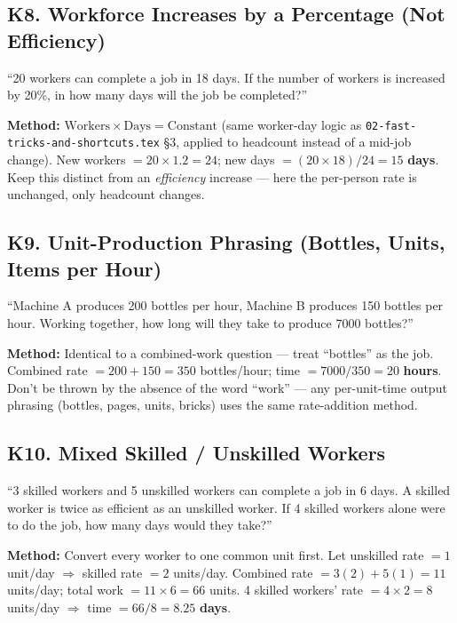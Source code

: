 \documentclass[11pt]{article}
\begin{document}
\subsection*{K8. Workforce Increases by a Percentage (Not Efficiency)}
\begin{tipbox}[Phrasing]
``20 workers can complete a job in 18 days. If the number of workers is increased by 20\%, in how
many days will the job be completed?''
\end{tipbox}
\textbf{Method:} $\text{Workers}\times\text{Days}=\text{Constant}$ (same worker-day logic as
\texttt{02-fast-tricks-and-shortcuts.tex} \S3, applied to headcount instead of a mid-job change). New
workers $=20\times1.2=24$; new days $=(20\times18)/24=15$ \textbf{days}. Keep this distinct from an
\emph{efficiency} increase --- here the per-person rate is unchanged, only headcount changes.

\subsection*{K9. Unit-Production Phrasing (Bottles, Units, Items per Hour)}
\begin{tipbox}[Phrasing]
``Machine A produces 200 bottles per hour, Machine B produces 150 bottles per hour. Working together,
how long will they take to produce 7000 bottles?''
\end{tipbox}
\textbf{Method:} Identical to a combined-work question --- treat ``bottles'' as the job. Combined
rate $=200+150=350$ bottles/hour; time $=7000/350=20$ \textbf{hours}. Don't be thrown by the absence
of the word ``work'' --- any per-unit-time output phrasing (bottles, pages, units, bricks) uses the
same rate-addition method.

\subsection*{K10. Mixed Skilled / Unskilled Workers}
\begin{tipbox}[Phrasing]
``3 skilled workers and 5 unskilled workers can complete a job in 6 days. A skilled worker is twice
as efficient as an unskilled worker. If 4 skilled workers alone were to do the job, how many days
would they take?''
\end{tipbox}
\textbf{Method:} Convert every worker to one common unit first. Let unskilled rate $=1$ unit/day
$\Rightarrow$ skilled rate $=2$ units/day. Combined rate $=3(2)+5(1)=11$ units/day; total work
$=11\times6=66$ units. 4 skilled workers' rate $=4\times2=8$ units/day $\Rightarrow$ time
$=66/8=8.25$ \textbf{days}.
\end{document}
